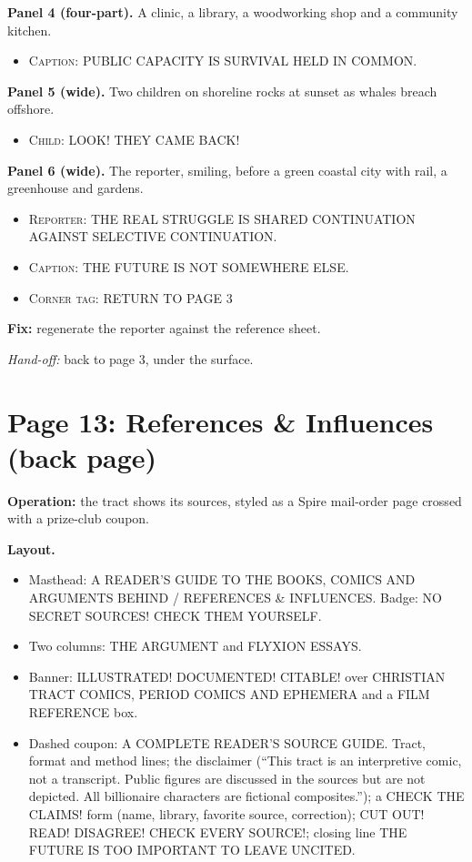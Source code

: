 \documentclass[11pt]{article}
\newcommand{\op}[1]{\textbf{Operation:} #1\par}
\newcommand{\panel}[2]{\textbf{#1.} #2\par}
\newenvironment{lines}{\begin{itemize}[label={},leftmargin=1.5em,itemsep=0.05em,topsep=0.1em]}{\end{itemize}}
\newcommand{\say}[2]{\item \textsc{#1}: \textsf{\small #2}}
\newcommand{\fix}[1]{\textcolor{tractred}{\textbf{Fix:}} #1\par}
\newcommand{\handoff}[1]{\emph{Hand-off:} #1\par}
\begin{document}
\panel{Panel 4 (four-part)}{A clinic, a library, a woodworking shop and a community kitchen.}
\begin{lines}\say{Caption}{PUBLIC CAPACITY IS SURVIVAL HELD IN COMMON.}\end{lines}

\panel{Panel 5 (wide)}{Two children on shoreline rocks at sunset as whales breach offshore.}
\begin{lines}\say{Child}{LOOK! THEY CAME BACK!}\end{lines}

\panel{Panel 6 (wide)}{The reporter, smiling, before a green coastal city with rail, a greenhouse and gardens.}
\begin{lines}\say{Reporter}{THE REAL STRUGGLE IS SHARED CONTINUATION AGAINST SELECTIVE CONTINUATION.}\say{Caption}{THE FUTURE IS NOT SOMEWHERE ELSE.}\say{Corner tag}{RETURN TO PAGE 3}\end{lines}

\fix{regenerate the reporter against the reference sheet.}
\handoff{back to page 3, under the surface.}

\section{Page 13: References \& Influences (back page)}

\op{the tract shows its sources, styled as a Spire mail-order page crossed with a prize-club coupon.}

\textbf{Layout.}
\begin{itemize}
\item Masthead: \textsf{\small A READER'S GUIDE TO THE BOOKS, COMICS AND ARGUMENTS BEHIND / REFERENCES \& INFLUENCES}. Badge: \textsf{\small NO SECRET SOURCES! CHECK THEM YOURSELF}.
\item Two columns: \textsf{\small THE ARGUMENT} and \textsf{\small FLYXION ESSAYS}.
\item Banner: \textsf{\small ILLUSTRATED! DOCUMENTED! CITABLE!} over \textsf{\small CHRISTIAN TRACT COMICS}, \textsf{\small PERIOD COMICS AND EPHEMERA} and a \textsf{\small FILM REFERENCE} box.
\item Dashed coupon: \textsf{\small A COMPLETE READER'S SOURCE GUIDE}. Tract, format and method lines; the disclaimer (``This tract is an interpretive comic, not a transcript. Public figures are discussed in the sources but are not depicted. All billionaire characters are fictional composites.''); a \textsf{\small CHECK THE CLAIMS!} form (name, library, favorite source, correction); \textsf{\small CUT OUT! READ! DISAGREE! CHECK EVERY SOURCE!}; closing line \textsf{\small THE FUTURE IS TOO IMPORTANT TO LEAVE UNCITED.}
\end{itemize}
\end{document}
